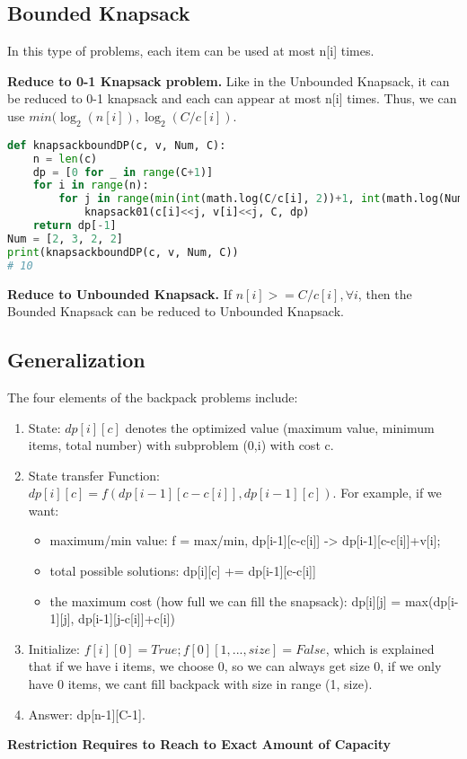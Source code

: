 \documentclass[../main.tex]{subfiles}
\begin{document}

\subsection{Bounded Knapsack}
\label{bound_knapsack}
In this type of problems, each item can be used at most n[i] times. 

\textbf{Reduce to 0-1 Knapsack problem.} Like in the Unbounded Knapsack, it can be reduced to 0-1 knapsack and each can appear at most n[i] times. Thus, we can use $min(\log_2(n[i]), \log_2(C/c[i])$.
\begin{lstlisting}[language=Python]
def knapsackboundDP(c, v, Num, C):
    n = len(c)
    dp = [0 for _ in range(C+1)] 
    for i in range(n):
        for j in range(min(int(math.log(C/c[i], 2))+1, int(math.log(Num[i], 2))+1)): # call it multiple times
            knapsack01(c[i]<<j, v[i]<<j, C, dp)
    return dp[-1]
Num = [2, 3, 2, 2]
print(knapsackboundDP(c, v, Num, C))
# 10
\end{lstlisting}
\textbf{Reduce to Unbounded Knapsack.} If $n[i] >= C/c[i], \forall i$, then the Bounded Knapsack can be reduced to Unbounded Knapsack. 

\subsection{Generalization}
The four elements of the backpack problems include:
\begin{enumerate}
\item State: $dp[i][c]$ denotes the optimized value (maximum value, minimum items, total number) with subproblem (0,i) with cost c.  
\item State transfer Function: $dp[i][c] = f( dp[i-1][c-c[i]], dp[i-1][c]) $. For example, if we want: 
\begin{itemize}
  \item maximum/min value: f = max/min, dp[i-1][c-c[i]] -> dp[i-1][c-c[i]]+v[i];
  \item total possible solutions: dp[i][c] += dp[i-1][c-c[i]]
  \item the maximum cost (how full we can fill the snapsack): dp[i][j] = max(dp[i-1][j], dp[i-1][j-c[i]]+c[i])
\end{itemize}
\item Initialize: $f[i][0] = True; f[0][1, ..., size] = False$, which is explained that if we have i items, we choose 0, so we can always get size 0, if we only have 0 items, we cant fill backpack with size in range (1, size).
\item Answer: dp[n-1][C-1].
\end{enumerate}
\textbf{Restriction Requires to Reach to Exact Amount of Capacity}
\end{document}
